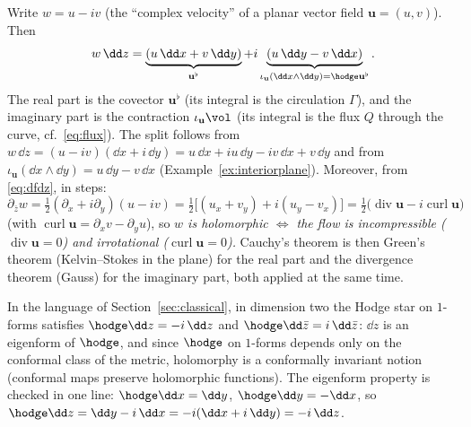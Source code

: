 Write $w=u-iv$ (the ``complex velocity'' of a planar vector field $\mathbf u=(u,v)$). Then
\begin{equation}\label{eq:wdz}
w\,\dd z=\underbrace{(u\,\dd x+v\,\dd y)}_{\mathbf u^\flat}+i\underbrace{(u\,\dd y-v\,\dd x)}_{\iota_{\mathbf u}(\dd x\wedge\dd y)=\hodge\mathbf u^\flat}.
\end{equation}
The real part is the covector $\mathbf u^\flat$ (its integral is the circulation $\Gamma$), and the imaginary part is the contraction $\iota_{\mathbf u}\vol$ (its integral is the flux $Q$ through the curve, cf.\ \eqref{eq:flux}). The split follows from $w\,\dd z=(u-iv)(\dd x+i\,\dd y)=u\,\dd x+iu\,\dd y-iv\,\dd x+v\,\dd y$ and from $\iota_{\mathbf u}(\dd x\wedge\dd y)=u\,\dd y-v\,\dd x$ (Example~\ref{ex:interiorplane}). Moreover, from \eqref{eq:dfdz}, in steps:
\[
\partial_{\bar z}w=\tfrac12(\partial_x+i\partial_y)(u-iv)=\tfrac12\bigl[(u_x+v_y)+i(u_y-v_x)\bigr]=\tfrac12\bigl(\operatorname{div}\mathbf u-i\operatorname{curl}\mathbf u\bigr)
\]
(with $\operatorname{curl}\mathbf u=\partial_xv-\partial_yu$), 
so \emph{$w$ is holomorphic $\iff$ the flow is incompressible ($\operatorname{div}\mathbf u=0$) and irrotational ($\operatorname{curl}\mathbf u=0$).}
Cauchy's theorem is then Green's theorem (Kelvin--Stokes in the plane) for the real part and the divergence theorem (Gauss) for the imaginary part, both applied at the same time.

\begin{specialcase}\label{sc:hodge2}
In the language of Section~\ref{sec:classical}, in dimension two the Hodge star on $1$-forms satisfies $\hodge\dd z=-i\,\dd z$ and $\hodge\dd\bar z=i\,\dd\bar z$: $\dd z$ is an eigenform of $\hodge$, and since $\hodge$ on $1$-forms depends only on the conformal class of the metric, holomorphy is a conformally invariant notion (conformal maps preserve holomorphic functions). The eigenform property is checked in one line: $\hodge\dd x=\dd y$, $\hodge\dd y=-\dd x$, so $\hodge\dd z=\dd y-i\,\dd x=-i(\dd x+i\,\dd y)=-i\,\dd z$.
\end{specialcase}
